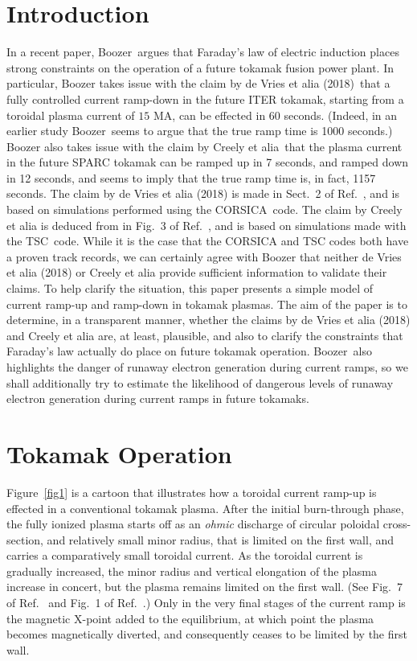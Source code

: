 \documentclass[12pt,prb,aps]{revtex4-1}
\begin{document}
\section{Introduction}
In a recent paper, Boozer\,\cite{boozer} argues  that Faraday's law of electric induction places strong constraints on the operation of a future  tokamak fusion power plant.
In particular, Boozer takes issue with the claim by de Vries et alia (2018)\,\cite{deVries} that a fully controlled current ramp-down in the future ITER tokamak, starting from a toroidal plasma current of $15$ MA,
can be effected in 60 seconds. (Indeed, in an earlier study Boozer\,\cite{boozer1} seems to argue that the true ramp time is 1000 seconds.)  Boozer also takes issue with the claim by Creely et alia\,\cite{creely} that the plasma current in the future SPARC tokamak can be ramped up in
7 seconds, and ramped down in 12 seconds, and seems to imply that the true ramp time is, in fact, 1157 seconds. The claim by de Vries et alia (2018) is
made in Sect.~2 of Ref.~, and is based on simulations performed using  the CORSICA\,\cite{corsica,corsica1}  code. The claim by Creely et alia is deduced from 
in Fig.~3 of Ref.~, and is based on simulations made with the TSC\,\cite{tsc}   code. While it is the case that the  CORSICA and TSC codes both have a proven 
track records, we can certainly agree with Boozer that neither de Vries et alia (2018) or Creely et alia provide sufficient information to validate their claims. 
To help clarify the situation, this paper presents a simple model of current ramp-up and ramp-down in tokamak plasmas. 
The aim of the paper is
to determine, in a transparent manner, whether the claims by de Vries et alia (2018) and Creely et alia are, at least, plausible, and also to clarify the constraints that Faraday's law
actually do place on future tokamak operation. Boozer\,\cite{boozer,boozer1}  also highlights the danger
of runaway electron generation during current ramps, so we shall additionally try to estimate the likelihood of dangerous levels of  runaway electron generation during current ramps
in  future tokamaks.  

\section{Tokamak Operation}
Figure~\ref{fig1} is a cartoon that illustrates how a toroidal current ramp-up is effected in a conventional tokamak plasma.\cite{lister,federici, jackson,politzer}
After the initial burn-through phase, the fully ionized plasma starts off as an {\em ohmic}\/  discharge of circular poloidal cross-section, and relatively
small minor radius, that is limited on the first wall, and carries a comparatively small toroidal current. As the toroidal current is
gradually increased, the minor radius and vertical elongation of the plasma increase in concert, but the plasma remains limited on
the first wall. (See Fig.~7 of Ref.~ and Fig.~1 of Ref.~.) Only in the very final stages of the current ramp is the magnetic X-point added to the equilibrium, at which point the
plasma becomes magnetically diverted, and consequently ceases to be limited by the first wall. 
\end{document}
